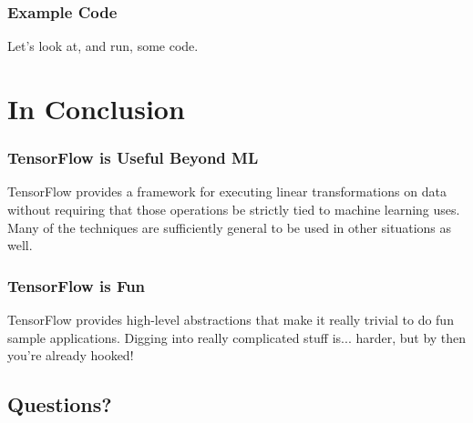 \documentclass{beamer}
\begin{document}
\begin{frame}
  \frametitle{Example Code}

  Let's look at, and run, some code.
\end{frame}

\section{In Conclusion}

\begin{frame}
  \frametitle{TensorFlow is Useful Beyond ML}

  TensorFlow provides a framework for executing linear transformations
  on data without requiring that those operations be strictly tied to
  machine learning uses.  Many of the techniques are sufficiently
  general to be used in other situations as well.
\end{frame}

\begin{frame}
  \frametitle{TensorFlow is Fun}

  TensorFlow provides high-level abstractions that make it really
  trivial to do fun sample applications.  Digging into really
  complicated stuff is... harder, but by then you're already hooked!
\end{frame}

\subsection{Questions?}
\end{document}
